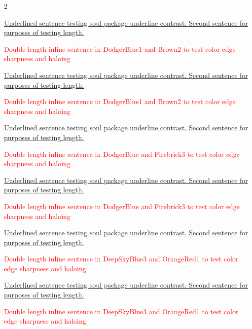 \begin{multicols}{2}
\clearpage
{}
\par\noindent\ul{Underlined sentence testing soul package underline contrast. Second sentence for purposes of testing length.}
\par\noindent\textcolor{Red}{Double length inline sentence in DodgerBlue1 and Brown2 to test color edge sharpness and haloing}
\clearpage
{}
\par\noindent\ul{Underlined sentence testing soul package underline contrast. Second sentence for purposes of testing length.}
\par\noindent\textcolor{Red}{Double length inline sentence in DodgerBlue1 and Brown2 to test color edge sharpness and haloing}
\clearpage
{}
\par\noindent\ul{Underlined sentence testing soul package underline contrast. Second sentence for purposes of testing length.}
\par\noindent\textcolor{Red}{Double length inline sentence in DodgerBlue and Firebrick3 to test color edge sharpness and haloing}
\clearpage
{}
\par\noindent\ul{Underlined sentence testing soul package underline contrast. Second sentence for purposes of testing length.}
\par\noindent\textcolor{Red}{Double length inline sentence in DodgerBlue and Firebrick3 to test color edge sharpness and haloing}
\clearpage
{}
\par\noindent\ul{Underlined sentence testing soul package underline contrast. Second sentence for purposes of testing length.}
\par\noindent\textcolor{Red}{Double length inline sentence in DeepSkyBlue3 and OrangeRed1 to test color edge sharpness and haloing}
\clearpage
{}
\par\noindent\ul{Underlined sentence testing soul package underline contrast. Second sentence for purposes of testing length.}
\par\noindent\textcolor{Red}{Double length inline sentence in DeepSkyBlue3 and OrangeRed1 to test color edge sharpness and haloing}

\end{multicols}
